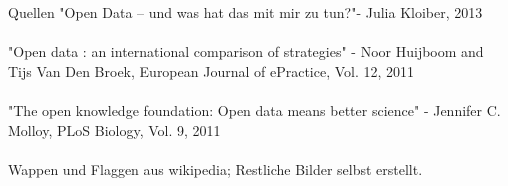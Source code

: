 \begin{frame}[t]{Quellen}
"Open Data -- und was hat das mit mir zu tun?"- Julia Kloiber, 2013\\
~\\
"Open data : an international comparison of strategies"
- Noor Huijboom and Tijs Van Den Broek, European Journal of ePractice, Vol. 12, 2011\\
~\\
"The open knowledge foundation: Open data means better science"
- Jennifer C. Molloy, PLoS Biology, Vol. 9, 2011\\
~\\
Wappen und Flaggen aus wikipedia; Restliche Bilder selbst erstellt.
\end{frame}


\nocite{*}


